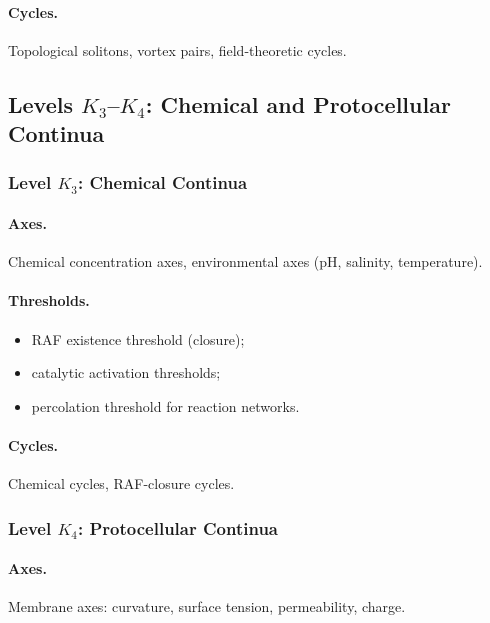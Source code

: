 \paragraph{Cycles.}
Topological solitons, vortex pairs, field-theoretic cycles.


\subsection{Levels \texorpdfstring{\texorpdfstring{$K_3$}{K\_3}–\texorpdfstring{$K_4$}{K\_4}}{K3–K4}: Chemical and Protocellular Continua}

\subsubsection{Level \texorpdfstring{\(K_3\)}{K3}: Chemical Continua}

\paragraph{Axes.}
Chemical concentration axes, environmental axes (pH, salinity, temperature).

\paragraph{Thresholds.}
\begin{itemize}
    \item RAF existence threshold (closure);
    \item catalytic activation thresholds;
    \item percolation threshold for reaction networks.
\end{itemize}

\paragraph{Cycles.}
Chemical cycles, RAF-closure cycles.

\subsubsection{Level \texorpdfstring{\(K_4\)}{K4}: Protocellular Continua}

\paragraph{Axes.}
Membrane axes: curvature, surface tension, permeability, charge.

